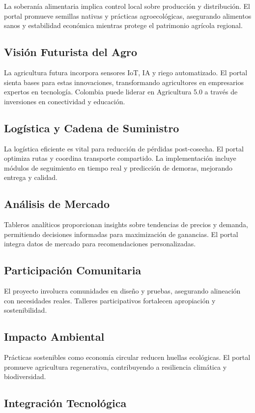 La soberanía alimentaria implica control local sobre producción y distribución. El portal promueve semillas nativas y prácticas agroecológicas, asegurando alimentos sanos y estabilidad económica mientras protege el patrimonio agrícola regional.
\subsection{Visión Futurista del Agro}

La agricultura futura incorpora sensores IoT, IA y riego automatizado. El portal sienta bases para estas innovaciones, transformando agricultores en empresarios expertos en tecnología. Colombia puede liderar en Agricultura 5.0 a través de inversiones en conectividad y educación.
\subsection{Logística y Cadena de Suministro}

La logística eficiente es vital para reducción de pérdidas post-cosecha. El portal optimiza rutas y coordina transporte compartido. La implementación incluye módulos de seguimiento en tiempo real y predicción de demoras, mejorando entrega y calidad.
\subsection{Análisis de Mercado}

Tableros analíticos proporcionan insights sobre tendencias de precios y demanda, permitiendo decisiones informadas para maximización de ganancias. El portal integra datos de mercado para recomendaciones personalizadas.
\subsection{Participación Comunitaria}

El proyecto involucra comunidades en diseño y pruebas, asegurando alineación con necesidades reales. Talleres participativos fortalecen apropiación y sostenibilidad.
\subsection{Impacto Ambiental}

Prácticas sostenibles como economía circular reducen huellas ecológicas. El portal promueve agricultura regenerativa, contribuyendo a resiliencia climática y biodiversidad.
\subsection{Integración Tecnológica}

